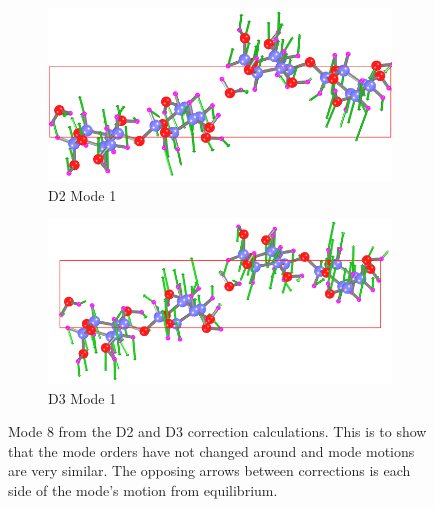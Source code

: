\begin{figure}[h]
\centering
\begin{subfigure}{1\textwidth}
    \centering
    \includegraphics[scale=0.7]{Figures/Analysis/IVDW/mode8_d2_new.png}
    \caption{D2 Mode 1}
    \label{fig:d2_mode1}
\end{subfigure}
\begin{subfigure}{1\textwidth}
    \centering
    \includegraphics[scale=0.7]{Figures/Analysis/IVDW/mode8_d3_new.png}
    \caption{D3 Mode 1}
    \label{fig:d3_mode1}
\end{subfigure}
\captionsetup{font = footnotesize, justification = centering}
\caption[Mode 8 from the D2 and D3 Correction Calculations]{Mode 8 from the D2 and D3 correction calculations. This is to show that the mode orders have not changed around and mode motions are very similar. The opposing arrows between corrections is each side of the mode's motion from equilibrium.}
\label{fig:mode1_both}
\end{figure}


